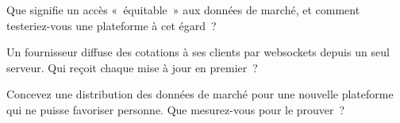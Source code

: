 \begin{interviewq}\label{iq:nw:the-asia-pacific-map:4}
Que signifie un accès «~équitable~» aux données de marché, et comment testeriez-vous une plateforme à cet égard~?
\end{interviewq}

\begin{interviewq}\label{iq:nw:the-asia-pacific-map:5}
Un fournisseur diffuse des cotations à ses clients par websockets depuis un seul serveur. Qui reçoit chaque mise à jour en premier~?
\end{interviewq}

\begin{interviewq}\label{iq:nw:the-asia-pacific-map:6}
Concevez une distribution des données de marché pour une nouvelle plateforme qui ne puisse favoriser personne. Que mesurez-vous pour le prouver~?
\end{interviewq}
